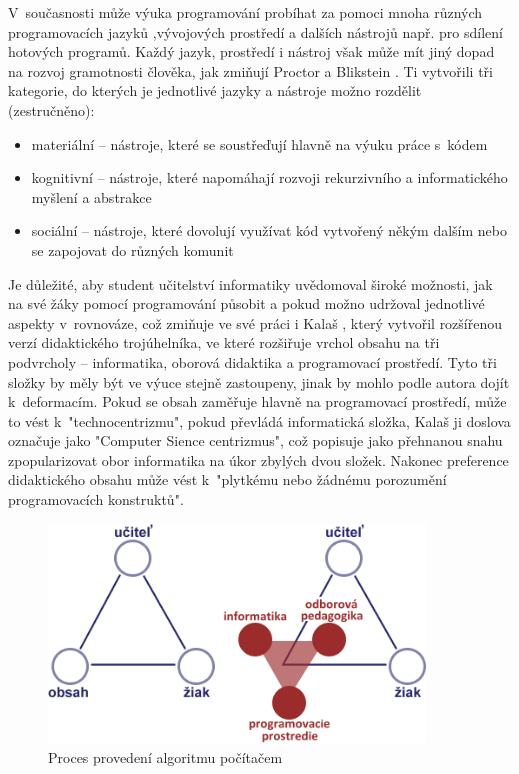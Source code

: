 \documentclass[FP,DP]{tulthesis}
\begin{document}
{{{{{{{V~současnosti může výuka programování probíhat za pomoci mnoha různých programovacích jazyků ,vývojových prostředí a dalších nástrojů např. pro sdílení hotových programů. Každý jazyk, prostředí i nástroj však může mít jiný dopad na rozvoj gramotnosti člověka, jak zmiňují Proctor a Blikstein \citep{proctor2016}. Ti vytvořili tři kategorie, do kterých je jednotlivé jazyky a nástroje možno rozdělit (zestručněno):
\vspace{2mm}\begin{itemize}[nosep]
  	\item materiální -- nástroje, které se soustřeďují hlavně na výuku práce s~kódem
	\item kognitivní -- nástroje, které napomáhají rozvoji rekurzivního a informatického myšlení a abstrakce
	\item sociální -- nástroje, které dovolují využívat kód vytvořený někým dalším nebo se zapojovat do různých komunit
\end{itemize}
Je důležité, aby student učitelství informatiky uvědomoval široké možnosti, jak na své žáky pomocí programování působit a pokud možno udržoval jednotlivé aspekty v~rovnováze, což zmiňuje ve své práci i Kalaš \citep{kalas2016}, který vytvořil rozšířenou verzí didaktického trojúhelníka, ve které rozšiřuje vrchol obsahu na tři podvrcholy -- informatika, oborová didaktika a programovací prostředí. Tyto tři složky by měly být ve výuce stejně zastoupeny, jinak by mohlo podle autora dojít k~deformacím. Pokud se obsah zaměřuje hlavně na programovací prostředí, může to vést k~"technocentrizmu", pokud převládá informatická složka, Kalaš ji doslova označuje jako "Computer Sience centrizmus", což popisuje jako přehnanou snahu zpopularizovat obor informatika na úkor zbylých dvou složek. Nakonec preference didaktického obsahu může vést k~"plytkému nebo žádnému porozumění programovacích konstruktů".
\begin{figure}
    \centering
    \includegraphics[width=100mm,scale=0.8]{kalas.png}
\caption{Proces provedení algoritmu počítačem \citep[s.~56]{spirit}} \label{provedeni3}
\end{figure}

}}}}}}}
\end{document}
